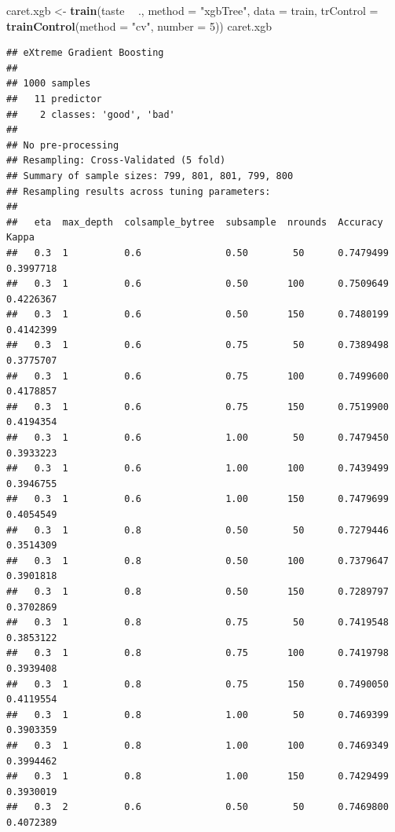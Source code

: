 \documentclass[
  spanish,
]{book}
\newenvironment{Shaded}{\begin{snugshade}}{\end{snugshade}}
\newcommand{\DataTypeTok}[1]{\textcolor[rgb]{0.13,0.29,0.53}{#1}}
\newcommand{\DecValTok}[1]{\textcolor[rgb]{0.00,0.00,0.81}{#1}}
\newcommand{\KeywordTok}[1]{\textcolor[rgb]{0.13,0.29,0.53}{\textbf{#1}}}
\newcommand{\NormalTok}[1]{#1}
\newcommand{\OperatorTok}[1]{\textcolor[rgb]{0.81,0.36,0.00}{\textbf{#1}}}
\newcommand{\StringTok}[1]{\textcolor[rgb]{0.31,0.60,0.02}{#1}}
\theoremstyle{break}
\theoremstyle{definition}
\theoremstyle{definition}
\theoremstyle{definition}
\theoremstyle{remark}
\begin{document}
\begin{Shaded}
\begin{Highlighting}[]
\NormalTok{caret.xgb <-}\StringTok{ }\KeywordTok{train}\NormalTok{(taste }\OperatorTok{~}\StringTok{ }\NormalTok{., }\DataTypeTok{method =} \StringTok{"xgbTree"}\NormalTok{, }\DataTypeTok{data =}\NormalTok{ train,}
                   \DataTypeTok{trControl =} \KeywordTok{trainControl}\NormalTok{(}\DataTypeTok{method =} \StringTok{"cv"}\NormalTok{, }\DataTypeTok{number =} \DecValTok{5}\NormalTok{))}
\NormalTok{caret.xgb}
\end{Highlighting}
\end{Shaded}

\begin{verbatim}
## eXtreme Gradient Boosting 
## 
## 1000 samples
##   11 predictor
##    2 classes: 'good', 'bad' 
## 
## No pre-processing
## Resampling: Cross-Validated (5 fold) 
## Summary of sample sizes: 799, 801, 801, 799, 800 
## Resampling results across tuning parameters:
## 
##   eta  max_depth  colsample_bytree  subsample  nrounds  Accuracy   Kappa    
##   0.3  1          0.6               0.50        50      0.7479499  0.3997718
##   0.3  1          0.6               0.50       100      0.7509649  0.4226367
##   0.3  1          0.6               0.50       150      0.7480199  0.4142399
##   0.3  1          0.6               0.75        50      0.7389498  0.3775707
##   0.3  1          0.6               0.75       100      0.7499600  0.4178857
##   0.3  1          0.6               0.75       150      0.7519900  0.4194354
##   0.3  1          0.6               1.00        50      0.7479450  0.3933223
##   0.3  1          0.6               1.00       100      0.7439499  0.3946755
##   0.3  1          0.6               1.00       150      0.7479699  0.4054549
##   0.3  1          0.8               0.50        50      0.7279446  0.3514309
##   0.3  1          0.8               0.50       100      0.7379647  0.3901818
##   0.3  1          0.8               0.50       150      0.7289797  0.3702869
##   0.3  1          0.8               0.75        50      0.7419548  0.3853122
##   0.3  1          0.8               0.75       100      0.7419798  0.3939408
##   0.3  1          0.8               0.75       150      0.7490050  0.4119554
##   0.3  1          0.8               1.00        50      0.7469399  0.3903359
##   0.3  1          0.8               1.00       100      0.7469349  0.3994462
##   0.3  1          0.8               1.00       150      0.7429499  0.3930019
##   0.3  2          0.6               0.50        50      0.7469800  0.4072389

\end{verbatim}
\end{document}
